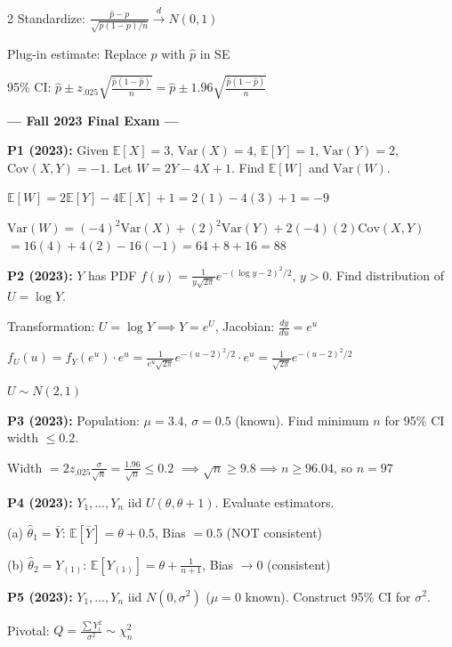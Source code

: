 \documentclass[10pt,letterpaper]{article}
\newcommand{\Var}{\text{Var}}
\newcommand{\Cov}{\text{Cov}}
\newcommand{\E}{\mathbb{E}}
\begin{document}
\begin{multicols}{2}
Standardize: $\frac{\hat{p} - p}{\sqrt{p(1-p)/n}} \xrightarrow{d} N(0,1)$

Plug-in estimate: Replace $p$ with $\hat{p}$ in SE

95\% CI: $\boxed{\hat{p} \pm z_{.025}\sqrt{\frac{\hat{p}(1-\hat{p})}{n}} = \hat{p} \pm 1.96\sqrt{\frac{\hat{p}(1-\hat{p})}{n}}}$

\vspace{2mm}


\begin{center}
\textbf{--- Fall 2023 Final Exam ---}
\end{center}

\vspace{1mm}

\textbf{P1 (2023):} Given $\E[X]=3$, $\Var(X)=4$, $\E[Y]=1$, $\Var(Y)=2$, $\Cov(X,Y)=-1$. Let $W = 2Y - 4X + 1$. Find $\E[W]$ and $\Var(W)$.

$\E[W] = 2\E[Y] - 4\E[X] + 1 = 2(1) - 4(3) + 1 = \boxed{-9}$

$\Var(W) = (-4)^2\Var(X) + (2)^2\Var(Y) + 2(-4)(2)\Cov(X,Y)$
$= 16(4) + 4(2) - 16(-1) = 64 + 8 + 16 = \boxed{88}$

\textbf{P2 (2023):} $Y$ has PDF $f(y) = \frac{1}{y\sqrt{2\pi}}e^{-(\log y-2)^2/2}$, $y > 0$. Find distribution of $U = \log Y$.

Transformation: $U = \log Y \implies Y = e^U$, Jacobian: $\frac{dy}{du} = e^u$

$f_U(u) = f_Y(e^u) \cdot e^u = \frac{1}{e^u\sqrt{2\pi}}e^{-(u-2)^2/2} \cdot e^u = \frac{1}{\sqrt{2\pi}}e^{-(u-2)^2/2}$

$\boxed{U \sim N(2, 1)}$

\textbf{P3 (2023):} Population: $\mu=3.4$, $\sigma=0.5$ (known). Find minimum $n$ for 95\% CI width $\le 0.2$.

Width $= 2z_{.025}\frac{\sigma}{\sqrt{n}} = \frac{1.96}{\sqrt{n}} \le 0.2$
$\implies \sqrt{n} \ge 9.8 \implies n \ge 96.04$, so $\boxed{n = 97}$

\textbf{P4 (2023):} $Y_1, \ldots, Y_n$ iid $U(\theta, \theta+1)$. Evaluate estimators.

(a) $\hat{\theta}_1 = \bar{Y}$: $\E[\bar{Y}] = \theta + 0.5$, Bias $= 0.5$ (NOT consistent)

(b) $\hat{\theta}_2 = Y_{(1)}$: $\E[Y_{(1)}] = \theta + \frac{1}{n+1}$, Bias $\to 0$ (consistent)

\textbf{P5 (2023):} $Y_1, \ldots, Y_n$ iid $N(0, \sigma^2)$ ($\mu=0$ known). Construct 95\% CI for $\sigma^2$.

Pivotal: $Q = \frac{\sum Y_i^2}{\sigma^2} \sim \chi^2_n$


\end{multicols}
\end{document}
